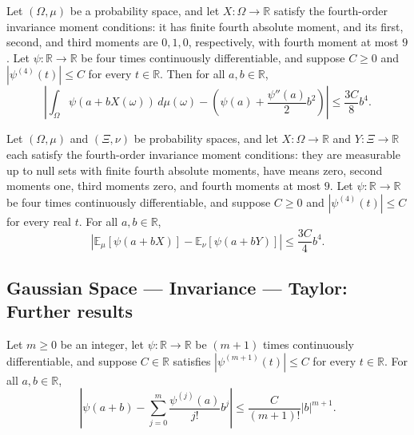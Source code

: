 \begin{theorem}
\leanok
{}
Let $(\Omega,\mu)$ be a probability space, and let $X:\Omega\to\mathbb R$ satisfy the
fourth-order invariance moment conditions: it has finite fourth absolute moment, and its
first, second, and third moments are $0,1,0$, respectively, with fourth moment at most
$9$. Let $\psi:\mathbb R\to\mathbb R$ be four times continuously differentiable, and
suppose $C\ge0$ and $|\psi^{(4)}(t)|\le C$ for every $t\in\mathbb R$. Then for all
$a,b\in\mathbb R$,
\[\left|\int_\Omega\psi(a+bX(\omega))\,d\mu(\omega)-\left(\psi(a)+\frac{\psi''(a)}2b^2\right)\right|\le\frac{3C}{8}b^4.\]
\end{theorem}

\begin{theorem}
\leanok
{}
Let $(\Omega,\mu)$ and $(\Xi,\nu)$ be probability spaces, and let
$X\colon\Omega\to\mathbb R$ and $Y\colon\Xi\to\mathbb R$ each satisfy the fourth-order
invariance moment conditions: they are measurable up to null sets with finite fourth
absolute moments, have means zero, second moments one, third moments zero, and fourth
moments at most $9$. Let $\psi\colon\mathbb R\to\mathbb R$ be four times continuously
differentiable, and suppose $C\ge0$ and $|\psi^{(4)}(t)|\le C$ for every real $t$. For
all $a,b\in\mathbb R$,
\[\left|\mathbb E_\mu[\psi(a+bX)]-\mathbb E_\nu[\psi(a+bY)]\right|\le\frac{3C}{4}b^4.\]
\end{theorem}

\subsection*{Gaussian Space --- Invariance --- Taylor: Further results}

\begin{theorem}
\label{BooleanAnalysis.GaussianSpace.abs_sub_taylor_le}
\leanok
{}
Let $m\ge0$ be an integer, let $\psi\colon\mathbb R\to\mathbb R$ be $(m+1)$ times
continuously differentiable, and suppose $C\in\mathbb R$ satisfies $|\psi^{(m+1)}(t)|\le
C$ for every $t\in\mathbb R$. For all $a,b\in\mathbb R$,
\[\left|\psi(a+b)-\sum_{j=0}^{m}\frac{\psi^{(j)}(a)}{j!}b^j\right|\le\frac{C}{(m+1)!}|b|^{m+1}.\]
\end{theorem}

